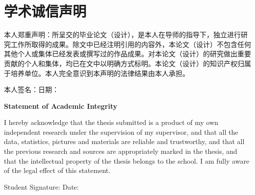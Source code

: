 \chapter*{学术诚信声明}
\fontsize{15}{20}\selectfont


本人郑重声明：所呈交的毕业论文（设计），是本人在导师的指导下，独立进行研究工作所取得的成果。除文中已经注明引用的内容外，本论文（设计）不包含任何其他个人或集体已经发表或撰写过的作品成果。对本论文（设计）的研究做出重要贡献的个人和集体，均已在文中以明确方式标明。本论文（设计）的知识产权归属于培养单位。本人完全意识到本声明的法律结果由本人承担。

\vspace{2\baselineskip}
	
本人签名：\hfill 日期： \hspace{4cm}

\vspace{2\baselineskip}

\begin{center}
	{\bfseries Statement of Academic Integrity}
\end{center}

I hereby acknowledge that the thesis submitted is a product of my own independent research under the supervision of my supervisor, and that all the data, statistics, pictures and materials are reliable and trustworthy, and that all the previous research and sources are appropriately marked in the thesis, and that the intellectual property of the thesis belongs to the school. I am fully aware of the legal effect of this statement.

\vspace{2\baselineskip}

Student Signature: \hfill Date: \hspace{4cm}
\endinput
